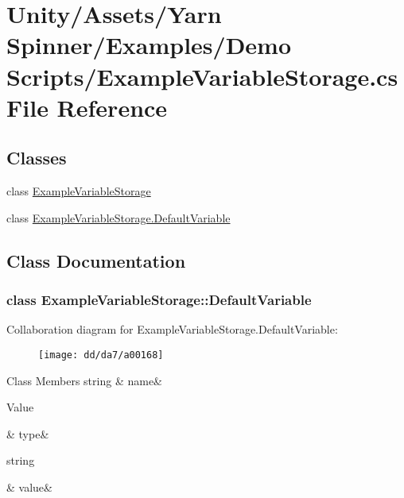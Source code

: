 \hypertarget{a00110}{\section{Unity/\-Assets/\-Yarn Spinner/\-Examples/\-Demo Scripts/\-Example\-Variable\-Storage.cs File Reference}
\label{a00110}
}
\subsection*{Classes}
\begin{DoxyCompactItemize}
\item 
class \hyperlink{a00033}{Example\-Variable\-Storage}
\item 
class \hyperlink{a00033_de/d38/a00160}{Example\-Variable\-Storage.\-Default\-Variable}
\end{DoxyCompactItemize}


\subsection{Class Documentation}
\label{de/d38/a00160}
\hypertarget{a00033_de/d38/a00160}{}
\subsubsection{class Example\-Variable\-Storage\-:\-:Default\-Variable}


Collaboration diagram for Example\-Variable\-Storage.\-Default\-Variable\-:
\nopagebreak
\begin{figure}[H]
\begin{center}
\leavevmode
\texttt{[image: dd/da7/a00168]}
\end{center}
\end{figure}
\begin{DoxyFields}{Class Members}
\hypertarget{a00033_a609feaa53936e7dc42248ff2ba68454a}{string}\label{a00033_a609feaa53936e7dc42248ff2ba68454a}
&
name&
\\
\hline

\hypertarget{a00033_a904347efdca12f40243c7dedb646153d}{Value}\label{a00033_a904347efdca12f40243c7dedb646153d}
&
type&
\\
\hline

\hypertarget{a00033_a0f00ecb21b58aa754a4bbb61edf62818}{string}\label{a00033_a0f00ecb21b58aa754a4bbb61edf62818}
&
value&
\\
\hline

\end{DoxyFields}
